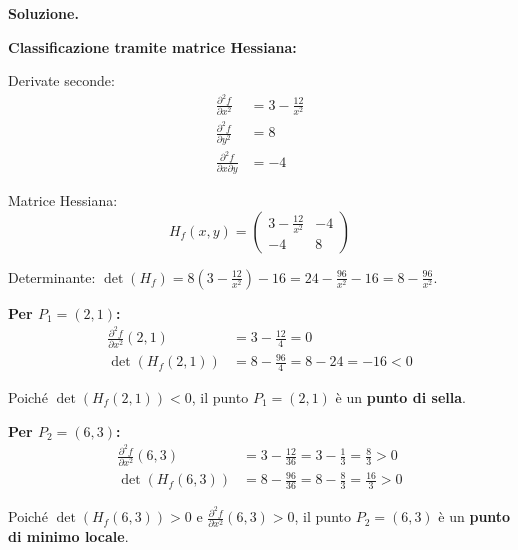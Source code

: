 \documentclass[12pt, a4paper]{article}
\newenvironment{solution}{%
    \par\noindent\textbf{Soluzione.}\medskip\par
    \normalfont
}{\par\bigskip}
\begin{document}
\begin{solution}
\begin{enumerate}
    \textbf{Classificazione tramite matrice Hessiana:}
    
    Derivate seconde:
    \begin{align}
        \frac{\partial^2 f}{\partial x^2} &= 3 - \frac{12}{x^2} \\
        \frac{\partial^2 f}{\partial y^2} &= 8 \\
        \frac{\partial^2 f}{\partial x \partial y} &= -4
    \end{align}
    
    Matrice Hessiana:
    \[H_f(x,y) = \begin{pmatrix} 
    3 - \frac{12}{x^2} & -4 \\ 
    -4 & 8 
    \end{pmatrix}\]
    
    Determinante: $\det(H_f) = 8\left(3 - \frac{12}{x^2}\right) - 16 = 24 - \frac{96}{x^2} - 16 = 8 - \frac{96}{x^2}$.
    
    \textbf{Per $P_1 = (2,1)$:}
    \begin{align}
        \frac{\partial^2 f}{\partial x^2}(2,1) &= 3 - \frac{12}{4} = 0 \\
        \det(H_f(2,1)) &= 8 - \frac{96}{4} = 8 - 24 = -16 < 0
    \end{align}
    
    Poiché $\det(H_f(2,1)) < 0$, il punto $P_1 = (2,1)$ è un \textbf{punto di sella}.
    
    \textbf{Per $P_2 = (6,3)$:}
    \begin{align}
        \frac{\partial^2 f}{\partial x^2}(6,3) &= 3 - \frac{12}{36} = 3 - \frac{1}{3} = \frac{8}{3} > 0 \\
        \det(H_f(6,3)) &= 8 - \frac{96}{36} = 8 - \frac{8}{3} = \frac{16}{3} > 0
    \end{align}
    
    Poiché $\det(H_f(6,3)) > 0$ e $\frac{\partial^2 f}{\partial x^2}(6,3) > 0$, il punto $P_2 = (6,3)$ è un \textbf{punto di minimo locale}.
\end{enumerate}
\end{solution}
\end{document}
